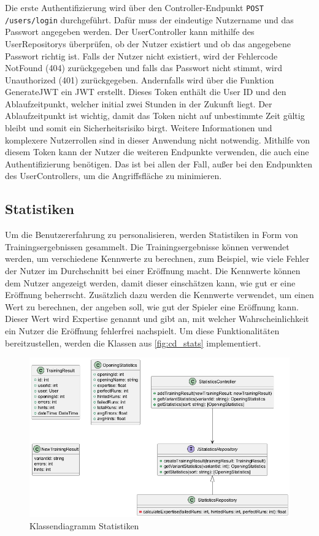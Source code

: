 Die erste Authentifizierung wird über den Controller-Endpunkt \lstinline{POST /users/login} durchgeführt. Dafür muss der eindeutige Nutzername und das Passwort angegeben werden. Der UserController kann mithilfe des UserRepositorys überprüfen, ob der Nutzer existiert und ob das angegebene Passwort richtig ist. Falls der Nutzer nicht existiert, wird der Fehlercode NotFound (404) zurückgegeben und falls das Passwort nicht stimmt, wird Unauthorized (401) zurückgegeben.
Andernfalls wird über die Funktion GenerateJWT ein \ac{JWT} erstellt. Dieses Token enthält die User ID und den Ablaufzeitpunkt, welcher initial zwei Stunden in der Zukunft liegt. Der Ablaufzeitpunkt ist wichtig, damit das Token nicht auf unbestimmte Zeit gültig bleibt und somit ein Sicherheitsrisiko birgt. Weitere Informationen und komplexere Nutzerrollen sind in dieser Anwendung nicht notwendig. Mithilfe von diesem Token kann der Nutzer die weiteren Endpunkte verwenden, die auch eine Authentifizierung benötigen. Das ist bei allen der Fall, außer bei den Endpunkten des UserControllers, um die Angriffsfläche zu minimieren.

\subsection{Statistiken}
Um die Benutzererfahrung zu personalisieren, werden Statistiken in Form von Trainingsergebnissen gesammelt. Die Trainingsergebnisse können verwendet werden, um verschiedene Kennwerte zu berechnen, zum Beispiel, wie viele Fehler der Nutzer im Durchschnitt bei einer Eröffnung macht. Die Kennwerte können dem Nutzer angezeigt werden, damit dieser einschätzen kann, wie gut er eine Eröffnung beherrscht. Zusätzlich dazu werden die Kennwerte verwendet, um einen Wert zu berechnen, der angeben soll, wie gut der Spieler eine Eröffnung kann. Dieser Wert wird Expertise genannt und gibt an, mit welcher Wahrscheinlichkeit ein Nutzer die Eröffnung fehlerfrei nachspielt. Um diese Funktionalitäten bereitzustellen, werden die Klassen aus \autoref{fig:cd_stats} implementiert.

\begin{figure}[h]
    \includegraphics[width=\linewidth]{images/diagrams/stats.png}
    \caption{Klassendiagramm Statistiken}
    \label{fig:cd_stats}
\end{figure}


